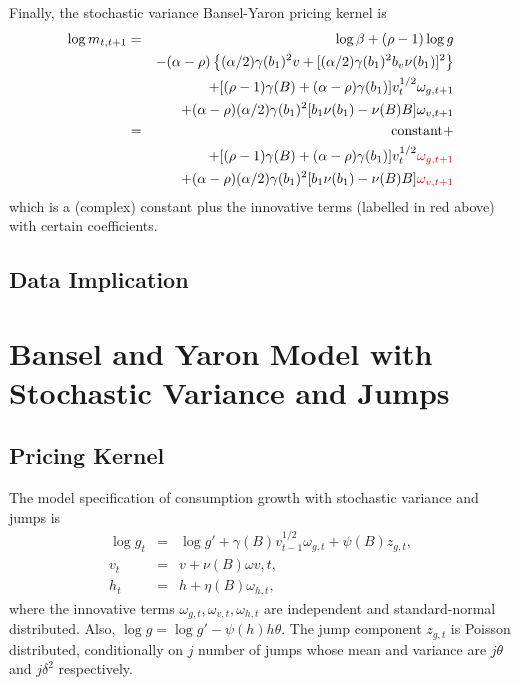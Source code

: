 \documentclass[11pt,reqno,final]{amsart}
\begin{document}
Finally, the stochastic variance Bansel-Yaron pricing kernel is
\begin{eqnarray*}
\log m_{t,t+1} &=& \log \beta + (\rho-1) \log g \\
    & & -(\alpha-\rho)\left\{(\alpha/2)\gamma(b_1)^2 v + [(\alpha/2)\gamma(b_1)^2 b_v\nu(b_1)]^2 \right\} \\
    & & + [(\rho-1)\gamma(B)+(\alpha-\rho)\gamma(b_1)] v_t^{1/2} \omega_{g,t+1} \\
    & & + (\alpha-\rho) (\alpha/2)\gamma(b_1)^2 [b_1\nu(b_1)-\nu(B)B]\omega_{v,t+1} \\
    &=& \textrm{constant} + \\
    & & + [(\rho-1)\gamma(B)+(\alpha-\rho)\gamma(b_1)] v_t^{1/2} {\color{red} \omega_{g,t+1}} \\
    & & + (\alpha-\rho) (\alpha/2)\gamma(b_1)^2 [b_1\nu(b_1)-\nu(B)B] {\color{red} \omega_{v,t+1}} \\
\end{eqnarray*}
which is a (complex) constant plus the innovative terms (labelled in red above) with certain coefficients. 


\subsection{Data Implication}


\bigskip

\section{Bansel and Yaron Model with Stochastic Variance and Jumps}
\subsection{Pricing Kernel} \label{sec::by2_jump}
The model specification of consumption growth with stochastic variance and jumps is
\begin{eqnarray}
\log g_t &=& \log g' + \gamma(B) v_{t-1}^{1/2} \omega_{g,t} + \psi(B)z_{g,t}, \nonumber \\
v_t &=& v + \nu(B) \omega{v,t}, \\
h_t &=& h + \eta(B)\omega_{h,t}, \nonumber
\end{eqnarray}
where the innovative terms $\omega_{g,t}, \omega_{v,t}, \omega_{h,t}$ are independent and standard-normal distributed. Also, $\log g = \log g' -\psi(h)h\theta$. The jump component $z_{g,t}$ is Poisson distributed, conditionally on $j$ number of jumps whose mean and variance are $j\theta$ and $j\delta^2$ respectively.
\end{document}
